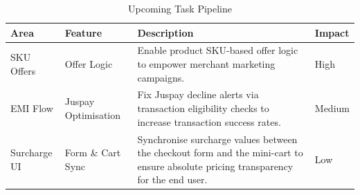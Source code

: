 \begin{table}[ht]
\centering
\caption{Upcoming Task Pipeline}
\label{tab:upcoming_tasks}
\begin{tabular}{p{3cm} p{4cm} p{6cm} p{1.5cm}}
\toprule
\textbf{Area} & \textbf{Feature} & \textbf{Description} & \textbf{Impact} \\
\midrule
SKU Offers   & Offer Logic         & Enable product SKU-based offer logic to empower merchant marketing campaigns. & High \\
\midrule
EMI Flow     & Juspay Optimisation & Fix Juspay decline alerts via transaction eligibility checks to increase transaction success rates. & Medium \\
\midrule
Surcharge UI & Form \& Cart Sync   & Synchronise surcharge values between the checkout form and the mini-cart to ensure absolute pricing transparency for the end user. & Low \\
\bottomrule
\end{tabular}
\end{table}
